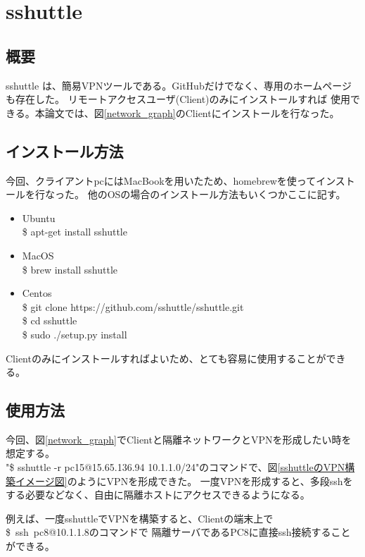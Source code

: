 \documentclass[11pt,a4j,titlepage]{jreport}
\begin{document}
\section{sshuttle}\label{sshuttle}
\subsection*{概要}
sshuttle \cite{sshuttle}は、簡易VPNツールである。GitHubだけでなく、専用のホームページも存在した\cite{sshuttle_page}。
リモートアクセスユーザ(Client)のみにインストールすれば
    使用できる。本論文では、図\ref{network_graph}のClientにインストールを行なった。
\subsection*{インストール方法}
今回、クライアントpcにはMacBookを用いたため、homebrewを使ってインストールを行なった。
他のOSの場合のインストール方法もいくつかここに記す。
\begin{itemize}
    \item Ubuntu \mbox{}\\ \$ apt-get install sshuttle
    \item MacOS \mbox{}\\ \$ brew install sshuttle
    \item Centos \mbox{}\\  \$ git clone https://github.com/sshuttle/sshuttle.git\\\$ cd sshuttle \\ \$ sudo ./setup.py install 
\end{itemize}
Clientのみにインストールすればよいため、とても容易に使用することができる。

\subsection*{使用方法}
今回、図\ref{network_graph}でClientと隔離ネットワークとVPNを形成したい時を想定する。\\
"\$ sshuttle -r pc15@15.65.136.94 10.1.1.0/24"のコマンドで、図\ref{sshuttleのVPN構築イメージ図}のようにVPNを形成できた。
一度VPNを形成すると、多段sshをする必要などなく、自由に隔離ホストにアクセスできるようになる。\par
例えば、一度sshuttleでVPNを構築すると、Clientの端末上で\\ \mbox{\$ ssh pc8@10.1.1.8}のコマンドで
隔離サーバであるPC8に直接ssh接続することができる。
\end{document}
